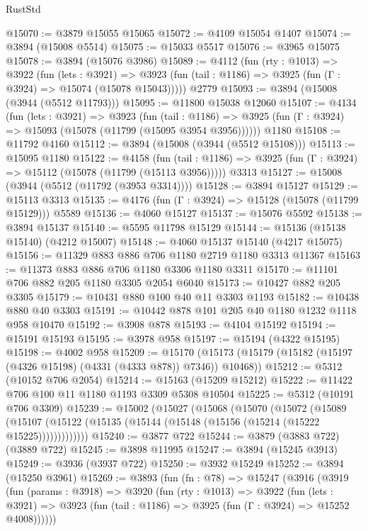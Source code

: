 \begin{lexlean}{RustStd}
\begin{coremodule}
@15070 := @3879 @15055 @15065
@15072 := @4109 @15054 @1407
@15074 := @3894 (@15008 @5514)
@15075 := @15033 @5517
@15076 := @3965 @15075
@15078 := @3894 (@15076 @3986)
@15089 := @4112
    (fun (rty : @1013) =>
    @3922
      (fun (lets : @3921) =>
      @3923 (fun (tail : @1186) => @3925 (fun (Γ : @3924) => @15074 (@15078 @15043)))))
    @2779
@15093 := @3894 (@15008 (@3944 (@5512 @11793)))
@15095 := @11800 @15038 @12060
@15107 := @4134
    (fun (lets : @3921) =>
    @3923
      (fun (tail : @1186) =>
      @3925 (fun (Γ : @3924) => @15093 (@15078 (@11799 (@15095 @3954 @3956))))))
    @1180
@15108 := @11792 @4160
@15112 := @3894 (@15008 (@3944 (@5512 @15108)))
@15113 := @15095 @1180
@15122 := @4158
    (fun (tail : @1186) => @3925 (fun (Γ : @3924) => @15112 (@15078 (@11799 (@15113 @3956)))))
    @3313
@15127 := @15008 (@3944 (@5512 (@11792 (@3953 @3314))))
@15128 := @3894 @15127
@15129 := @15113 @3313
@15135 := @4176 (fun (Γ : @3924) => @15128 (@15078 (@11799 @15129))) @5589
@15136 := @4060 @15127
@15137 := @15076 @5592
@15138 := @3894 @15137
@15140 := @5595 @11798 @15129
@15144 := @15136 (@15138 @15140) (@4212 @15007)
@15148 := @4060 @15137 @15140 (@4217 @15075)
@15156 := @11329 @883 @886 @706 @1180 @2719 @1180 @3313 @11367
@15163 := @11373 @883 @886 @706 @1180 @3306 @1180 @3311
@15170 := @11101 @706 @882 @205 @1180 @3305 @2054 @6040
@15173 := @10427 @882 @205 @3305
@15179 := @10431 @880 @100 @40 @11 @3303 @1193
@15182 := @10438 @880 @40 @3303
@15191 := @10442 @878 @101 @205 @40 @1180 @1232 @1118 @958 @10470
@15192 := @3908 @878
@15193 := @4104 @15192
@15194 := @15191 @15193
@15195 := @3978 @958
@15197 := @15194 (@4322 @15195)
@15198 := @4002 @958
@15209 := @15170
    (@15173 (@15179 (@15182 (@15197 (@4326 @15198) (@4331 (@4333 @878)) @7346)) @10468))
@15212 := @5312 (@10152 @706 @2054)
@15214 := @15163 (@15209 @15212)
@15222 := @11422 @706 @100 @11 @1180 @1193 @3309 @5308 @10504
@15225 := @5312 (@10191 @706 @3309)
@15239 := @15002
    (@15027
      (@15068
        (@15070
          (@15072
            (@15089
              (@15107 (@15122 (@15135 (@15144 (@15148 (@15156 (@15214 (@15222 @15225)))))))))))))
@15240 := @3877 @722
@15244 := @3879 (@3883 @722) (@3889 @722)
@15245 := @3898 @11995
@15247 := @3894 (@15245 @3913)
@15249 := @3936 (@3937 @722)
@15250 := @3932 @15249
@15252 := @3894 (@15250 @3961)
@15269 := @3893
    (fun (fn : @78) =>
    @15247
      (@3916
        (@3919
          (fun (params : @3918) =>
          @3920
            (fun (rty : @1013) =>
            @3922
              (fun (lets : @3921) =>
              @3923 (fun (tail : @1186) => @3925 (fun (Γ : @3924) => @15252 @4008))))))

\end{coremodule}
\end{lexlean}

